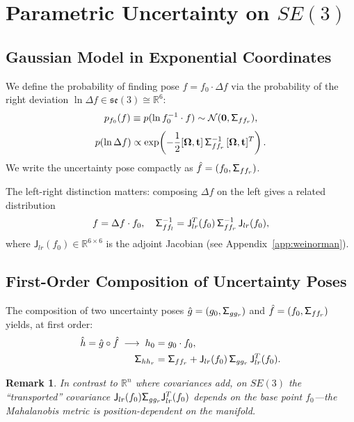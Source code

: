 \documentclass[journal]{IEEEtran}
\newcommand{\real}{\mathbb{R}}
\newcommand{\bfOmega}{\boldsymbol{\Omega}}
\newcommand{\sfSigma}[1]{\mathsf{\Sigma}_\mathnormal{#1}}
\newcommand{\beq}{\begin{equation}}
\newcommand{\eeq}{\end{equation}}
\newtheorem{remark}{Remark}
\begin{document}
\section{Parametric Uncertainty on $SE(3)$}
\label{sec:uncertainty}

\subsection{Gaussian Model in Exponential Coordinates}

We define the probability of finding pose $f = f_0 \cdot \Delta f$ 
via the probability of the right deviation 
$\ln \Delta f \in \mathfrak{se}(3) \cong \real^6$:
\beq
    p_{f_0}(f) \equiv p(\ln f_0^{-1} \cdot f) \sim 
    \mathcal{N}(\mathbf{0}, \sfSigma{ff_r}),
    \label{eq:gaussianSE3}
\eeq
\beq
    p(\ln \Delta f) \propto 
    \exp\!\left(-\frac{1}{2}[\bfOmega, \mathbf{t}]\,
    \sfSigma{ff_r}^{-1}\, [\bfOmega, \mathbf{t}]^T\right).
    \label{eq:gaussexplicit}
\eeq
We write the uncertainty pose compactly as 
$\hat{f} = (f_0, \sfSigma{ff_r})$.

The left-right distinction matters: composing 
$\Delta f$ on the left gives a related distribution
\beq
    f = \Delta f \cdot f_0,\quad
    \sfSigma{ff_l}^{-1} = \mathsf{J}_{lr}^T(f_0)\,
    \sfSigma{ff_r}^{-1}\, \mathsf{J}_{lr}(f_0),
    \label{eq:leftright}
\eeq
where $\mathsf{J}_{lr}(f_0) \in \real^{6 \times 6}$ is the 
adjoint Jacobian (see Appendix~\ref{app:weinorman}).

\subsection{First-Order Composition of Uncertainty Poses}

The composition of two uncertainty poses 
$\hat{g} = (g_0, \sfSigma{gg_r})$ and 
$\hat{f} = (f_0, \sfSigma{ff_r})$ yields, 
at first order:
\beq
\begin{split}
    \hat{h} = \hat{g} \circ \hat{f} \;\longrightarrow\;
    h_0 &= g_0 \cdot f_0, \\
    \sfSigma{hh_r} &= \sfSigma{ff_r} + 
    \mathsf{J}_{lr}(f_0)\, \sfSigma{gg_r}\, 
    \mathsf{J}_{lr}^T(f_0).
\end{split}
\label{eq:firstordercomp}
\eeq

\begin{remark}
In contrast to $\real^n$ where covariances add, 
on $SE(3)$ the ``transported'' covariance 
$\mathsf{J}_{lr}(f_0)\sfSigma{gg_r}\mathsf{J}_{lr}^T(f_0)$ 
depends on the base point $f_0$---the Mahalanobis metric 
is position-dependent on the manifold.
\end{remark}
\end{document}
